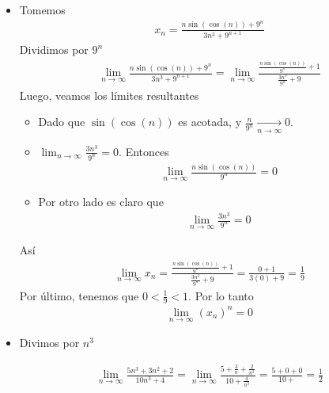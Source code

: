 \documentclass[12pt]{book}
\begin{document}
\begin{itemize}
    \item[\textbf{a)}] Tomemos 
    \begin{align*}
        x_n= \frac{n \sin(\cos(n))+9^n}{3n^3+9^{n+1}}
    \end{align*}
    Dividimos por $9^n$
    \begin{align*}
        \lim_{n \to \infty}\frac{n \sin(\cos(n))+9^n}{3n^3+9^{n+1}}= \lim_{n \to \infty} \frac{\frac{n \sin(\cos(n))}{9^n}+1}{\frac{3n^3}{9^n}+9}
    \end{align*}
    Luego, veamos los límites resultantes
    \begin{itemize}
        \item  Dado que $\sin(\cos(n))$ es acotada, y $\displaystyle \frac{n}{9^n} \underset{n \to \infty}{\longrightarrow} 0$.
        \item $\displaystyle \lim_{n \to \infty}\frac{3n^3}{9^n} =0$. Entonces 
        \begin{align*}
          \lim_{n \to \infty} \frac{n \sin(\cos(n))}{9^n}=0
        \end{align*}
        \item Por otro lado es claro que 
        \begin{align*}
            \lim_{n  \to \infty} \frac{3n^3}{9^n}=0
        \end{align*}
    \end{itemize}
    Así 
    \begin{align*}
        \lim_{n \to \infty} x_n= \frac{\frac{n \sin(\cos(n))}{9^n}+1}{\frac{3n^3}{9^n}+9}= \frac{0+1}{3(0)+9}=\frac{1}{9}
    \end{align*}
    Por último, tenemos que $0<\frac{1}{9} <1$. Por lo tanto
    \begin{align*}
        \lim_{n \to \infty} (x_n)^n =0
    \end{align*}

    \item[\textbf{b)}] Divimos por $n^3$

    \begin{align*}
        \lim_{n\to \infty} \frac{5n^3+3n^2+2}{10n^3+4}= \lim_{n\to \infty} \frac{5+\frac{3}{n}+\frac{2}{n^3}}{10+\frac{4}{n^3}}=\frac{5+0+0}{10+}=\frac{1}{2}
    \end{align*}


\end{itemize}
\end{document}
